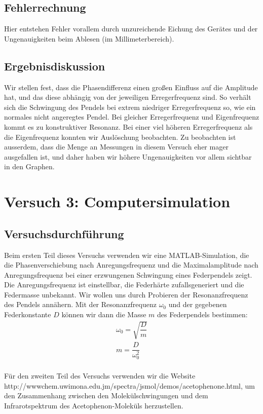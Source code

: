 \documentclass{scrartcl}
\begin{document}
\subsection{Fehlerrechnung}

Hier entstehen Fehler vorallem durch unzureichende Eichung des Gerätes und der Ungenauigkeiten beim Ablesen (im Millimeterbereich).

\subsection{Ergebnisdiskussion}
Wir stellen fest, dass die Phasendifferenz einen großen Einfluss auf die Amplitude hat, und das diese abhängig von der jeweiligen Erregerfrequenz sind. So verhält sich die Schwingung des Pendels bei extrem niedriger Erregerfrequenz so, wie ein normales nicht angeregtes Pendel. Bei gleicher Erregerfrequenz und Eigenfrequenz kommt es zu konstruktiver Resonanz. Bei einer viel höheren Erregerfrequenz als die Eigenfrequenz konnten wir Auslöschung beobachten. Zu beobachten ist ausserdem, dass die Menge an Messungen in diesem Versuch eher mager ausgefallen ist, und daher haben wir höhere Ungenauigkeiten vor allem sichtbar in den Graphen.

\section{Versuch 3: Computersimulation}
\subsection{Versuchsdurchführung}
Beim ersten Teil dieses Versuchs verwenden wir eine MATLAB-Simulation, die die Phasenverschiebung nach Anregungsfrequenz und die Maximalamplitude nach Anregungsfrequenz bei einer erzwungenen Schwingung eines Federpendels zeigt. Die Anregungsfrequenz ist einstellbar, die Federhärte zufallsgeneriert und die Federmasse unbekannt. Wir wollen uns durch Probieren der Resonanzfrequenz des Pendels annähern. Mit der Resonanzfrequenz $\omega_{0}$ und der gegebenen Federkonstante $D$ können wir dann die Masse $m$ des Federpendels bestimmen:
\begin{align*}
\omega_{0} = \sqrt{\dfrac{D}{m}} \\
m = \dfrac{D}{\omega_{0}^2}
\end{align*}
\\
Für den zweiten Teil des Versuchs verwenden wir die Website \\http://wwwchem.uwimona.edu.jm/spectra/jsmol/demos/acetophenone.html, um den Zusammenhang zwischen den Molekülschwingungen und dem Infrarotspektrum des Acetophenon-Moleküls herzustellen.
\end{document}

